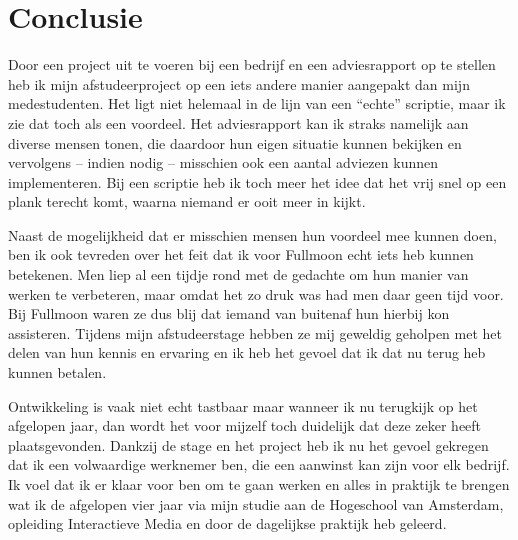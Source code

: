 \chapter{Conclusie}

Door een project uit te voeren bij een bedrijf en een adviesrapport op te stellen heb ik mijn afstudeerproject op een iets andere manier aangepakt dan mijn medestudenten. Het ligt niet helemaal in de lijn van een ``echte'' scriptie, maar ik zie dat toch als een voordeel. Het adviesrapport kan ik straks namelijk aan diverse mensen tonen, die daardoor hun eigen situatie kunnen bekijken en vervolgens -- indien nodig -- misschien ook een aantal adviezen kunnen implementeren. Bij een scriptie heb ik toch meer het idee dat het vrij snel op een plank terecht komt, waarna niemand er ooit meer in kijkt.

Naast de mogelijkheid dat er misschien mensen hun voordeel mee kunnen doen, ben ik ook tevreden over het feit dat ik voor Fullmoon echt iets heb kunnen betekenen. Men liep al een tijdje rond met de gedachte om hun manier van werken te verbeteren, maar omdat het zo druk was had men daar geen tijd voor. Bij Fullmoon waren ze dus blij dat iemand van buitenaf hun hierbij kon assisteren. Tijdens mijn afstudeerstage hebben ze mij geweldig geholpen met het delen van hun kennis en ervaring en ik heb het gevoel dat ik dat nu terug heb kunnen betalen.

Ontwikkeling is vaak niet echt tastbaar maar wanneer ik nu terugkijk op het afgelopen jaar, dan wordt het voor mijzelf toch duidelijk dat deze zeker heeft plaatsgevonden. Dankzij de stage en het project heb ik nu het gevoel gekregen dat ik een volwaardige werknemer ben, die een aanwinst kan zijn voor elk bedrijf. Ik voel dat ik er klaar voor ben om te gaan werken en alles in praktijk te brengen wat ik de afgelopen vier jaar via mijn studie aan de Hogeschool van Amsterdam, opleiding Interactieve Media en door de dagelijkse praktijk heb geleerd.
